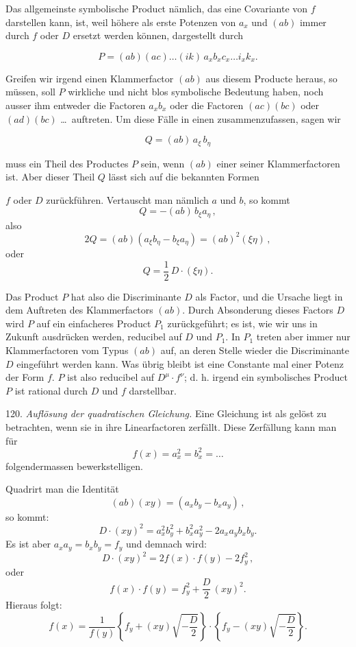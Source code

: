 Das allgemeinste symbolische Product nämlich, das eine Covariante
von $f$ darstellen kann, ist, weil höhere als erste Potenzen von $a_x$ und
$(ab)$ immer durch $f$ oder $D$ ersetzt werden können, dargestellt durch

\[
P = (ab)(ac) \dots (ik)\,a_x b_x c_x \dots i_x k_x.
\]

Greifen wir irgend einen Klammerfactor $(ab)$ aus diesem Producte
heraus, so müssen, soll $P$ wirkliche und nicht blos symbolische Bedeutung
haben, noch ausser ihm entweder die Factoren $a_x b_x$ oder die Factoren
$(ac)(bc)$ oder $(ad)(bc)$ \dots\ auftreten. Um diese Fälle in einen
zusammenzufassen, sagen wir

\[
Q = (ab)\,a_\xi\,b_\eta
\]

muss ein Theil des Productes $P$ sein, wenn $(ab)$ einer seiner Klammerfactoren
ist. Aber dieser Theil $Q$ lässt sich auf die bekannten Formen


$f$ oder $D$ zurückführen. Vertauscht man nämlich $a$ und $b$, so kommt
\[
Q = -(ab)\,b_\xi a_\eta\,,
\]
also
\[
2Q = (ab)(a_\xi b_\eta - b_\xi a_\eta) = (ab)^2(\xi\eta)\,,
\]
oder
\[
Q = \frac{1}{2}\,D\cdot(\xi\eta).
\]

Das Product $P$ hat also die Discriminante $D$ als Factor, und die Ursache liegt in dem Auftreten des Klammerfactors $(ab)$. Durch Absonderung dieses Factors $D$ wird $P$ auf ein einfacheres Product $P_1$ zurückgeführt; es ist, wie wir uns in Zukunft ausdrücken werden, reducibel auf $D$ und $P_1$. In $P_1$ treten aber immer nur Klammerfactoren vom Typus $(ab)$ auf, an deren Stelle wieder die Discriminante $D$ eingeführt werden kann. Was übrig bleibt ist eine Constante mal einer Potenz der Form $f$. $P$ ist also reducibel auf $D^\mu\cdot f^\nu$; d. h. irgend ein symbolisches Product $P$ ist rational durch $D$ und $f$ darstellbar.

120. \textit{Auflösung der quadratischen Gleichung.} Eine Gleichung ist als gelöst zu betrachten, wenn sie in ihre Linearfactoren zerfällt. Diese Zerfällung kann man für
\[
f(x) = a_x^2 = b_x^2 = \ldots
\]
folgendermassen bewerkstelligen.

Quadrirt man die Identität
\[
(ab)(xy) = (a_x b_y - b_x a_y)\,,
\]
so kommt:
\[
D\cdot(xy)^2 = a_x^2 b_y^2 + b_x^2 a_y^2 - 2a_x a_y b_x b_y.
\]
Es ist aber $a_x a_y = b_x b_y = f_y$ und demnach wird:
\[
D\cdot(xy)^2 = 2f(x)\cdot f(y) - 2f_y^2\,,
\]
oder
\[
f(x)\cdot f(y) = f_y^2 + \frac{D}{2}\,(xy)^2.
\]
Hieraus folgt:
\[
f(x) = \frac{1}{f(y)}\left\{f_y + (xy)\sqrt{-\frac{D}{2}}\right\}\cdot\left\{f_y - (xy)\sqrt{-\frac{D}{2}}\right\}.
\]

